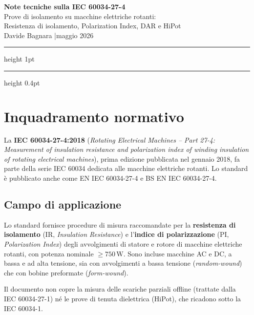 \documentclass[a4paper,11pt]{article}
\begin{document}
\begin{center}
  {\LARGE\bfseries\color{docblue}
    Note tecniche sulla IEC 60034-27-4}\\[6pt]
  {\large Prove di isolamento su macchine elettriche rotanti:\\
  Resistenza di isolamento, Polarization Index, DAR e HiPot}\\[10pt]
  {\normalsize Davide Bagnara \quad|\quad maggio 2026}
\end{center}

\vspace{4mm}
\hrule height 1pt
\vspace{6mm}

\tableofcontents
\vspace{6mm}
\hrule height 0.4pt
\vspace{4mm}

\section{Inquadramento normativo}

La \textbf{IEC 60034-27-4:2018} (\emph{Rotating Electrical Machines -- Part 27-4: Measurement of insulation resistance and polarization index of winding insulation of rotating electrical machines}), prima edizione pubblicata nel gennaio 2018, fa parte della serie IEC 60034 dedicata alle macchine elettriche rotanti. Lo standard è pubblicato anche come EN IEC 60034-27-4 e BS EN IEC 60034-27-4.

\subsection{Campo di applicazione}

Lo standard fornisce procedure di misura raccomandate per la \textbf{resistenza di isolamento} (IR, \emph{Insulation Resistance}) e l'\textbf{indice di polarizzazione} (PI, \emph{Polarization Index}) degli avvolgimenti di statore e rotore di macchine elettriche rotanti, con potenza nominale $\geq 750\,\text{W}$. Sono incluse macchine AC e DC, a bassa e ad alta tensione, sia con avvolgimenti a bassa tensione (\emph{random-wound}) che con bobine preformate (\emph{form-wound}).

Il documento non copre la misura delle scariche parziali offline (trattate dalla IEC 60034-27-1) né le prove di tenuta dielettrica (HiPot), che ricadono sotto la IEC 60034-1.
\end{document}
